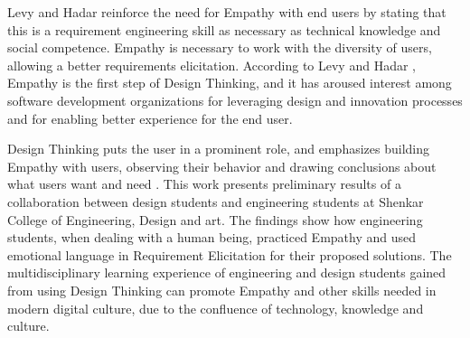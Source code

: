 \documentclass[conference]{IEEEtran}
\begin{document}

Levy and Hadar \cite{DBLP:conf/re/LevyH18} reinforce the need for Empathy with end users by stating that this is a requirement engineering skill as necessary as technical knowledge and social competence. Empathy is necessary to work with the diversity of users, allowing a better requirements elicitation. According to Levy and Hadar \cite{DBLP:conf/re/LevyH18}, Empathy is the first step of Design Thinking, and it has aroused interest among software development organizations for leveraging design and innovation processes and for enabling better experience for the end user. 

Design Thinking puts the user in a prominent role, and emphasizes building Empathy with users, observing their behavior and drawing conclusions about what users want and need \cite{DBLP:conf/re/LevyH18}. This work presents preliminary results of a collaboration between design students and engineering students at Shenkar College of Engineering, Design and art. The findings show how engineering students, when dealing with a human being, practiced Empathy and used emotional language in Requirement Elicitation for their proposed solutions. The multidisciplinary learning experience of engineering and design students gained from using Design Thinking can promote Empathy and other skills needed in modern digital culture, due to the confluence of technology, knowledge and culture.
\end{document}
